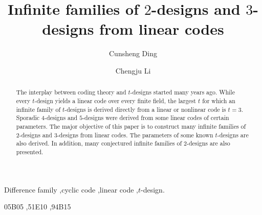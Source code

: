 \documentclass[1p,final]{elsarticle}
\begin{document}
\begin{frontmatter}



\title{Infinite families of $2$-designs and $3$-designs from linear codes 
}

\author[cding]{Cunsheng Ding}
\author[lcj]{Chengju Li}


\address[cding]{Department of Computer Science
                                                  and Engineering, The Hong Kong University of Science and Technology,
                                                  Clear Water Bay, Kowloon, Hong Kong, China}
\address[lcj]{School of Computer Science and Software Engineering, East China Normal University, Shanghai, 200062, China}



\begin{abstract}
The interplay between coding theory and $t$-designs started many years ago. While every
$t$-design yields a linear code over every finite field, the largest $t$ for which an infinite
family of $t$-designs is derived directly from a linear or nonlinear code is $t=3$. Sporadic 
$4$-designs and 
$5$-designs were derived from some linear codes of certain parameters. The major objective 
of this paper is to construct many infinite families of $2$-designs and $3$-designs from linear  
codes. The parameters of some known $t$-designs are also derived. In addition, many conjectured 
infinite families of $2$-designs are also presented.  
\end{abstract}

\begin{keyword}
Difference family \sep cyclic code \sep linear code \sep $t$-design.

\MSC  05B05 \sep 51E10 \sep 94B15 

\end{keyword}

\end{frontmatter}
\end{document}
